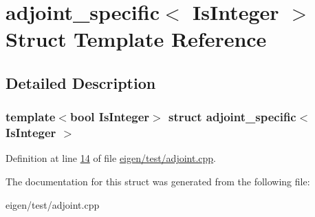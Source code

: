 \hypertarget{structadjoint__specific}{}\section{adjoint\+\_\+specific$<$ Is\+Integer $>$ Struct Template Reference}
\label{structadjoint__specific}


\subsection{Detailed Description}
\subsubsection*{template$<$bool Is\+Integer$>$\newline
struct adjoint\+\_\+specific$<$ Is\+Integer $>$}



Definition at line \hyperlink{eigen_2test_2adjoint_8cpp_source_l00014}{14} of file \hyperlink{eigen_2test_2adjoint_8cpp_source}{eigen/test/adjoint.\+cpp}.



The documentation for this struct was generated from the following file\+:\begin{DoxyCompactItemize}
\item 
eigen/test/adjoint.\+cpp\end{DoxyCompactItemize}
